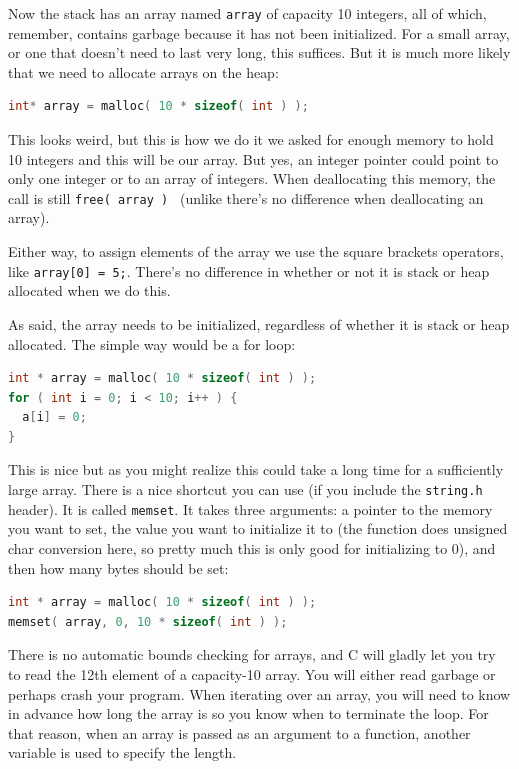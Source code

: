 Now the stack has an array named \texttt{array} of capacity 10 integers, all of which, remember, contains garbage because it has not been initialized. For a small array, or one that doesn't need to last very long, this suffices. But it is much more likely that we need to allocate arrays on the heap:

\begin{lstlisting}[language=C]
int* array = malloc( 10 * sizeof( int ) );
\end{lstlisting}

This looks weird, but this is how we do it we asked for enough memory to hold 10 integers and this will be our array. But yes, an integer pointer could point to only one integer or to an array of integers. When deallocating this memory, the call is still \texttt{free( array ) } (unlike \Cpp there's no difference when deallocating an array).

Either way, to assign elements of the array we use the square brackets operators, like \texttt{array[0] = 5;}. There's no difference in whether or not it is stack or heap allocated when we do this.

As said, the array needs to be initialized, regardless of whether it is stack or heap allocated. The simple way would be a for loop:

\begin{lstlisting}[language=C]
int * array = malloc( 10 * sizeof( int ) );
for ( int i = 0; i < 10; i++ ) {
  a[i] = 0;
}
\end{lstlisting}

This is nice but as you might realize this could take a long time for a sufficiently large array. There is a nice shortcut you can use (if you include the \texttt{string.h} header). It is called \texttt{memset}. It takes three arguments: a pointer to the memory you want to set, the value you want to initialize it to (the function does unsigned char conversion here, so pretty much this is only good for initializing to 0), and then how many bytes should be set:

\begin{lstlisting}[language=C]
int * array = malloc( 10 * sizeof( int ) );
memset( array, 0, 10 * sizeof( int ) );
\end{lstlisting}

There is no automatic bounds checking for arrays, and C will gladly let you try to read the 12th element of a capacity-10 array. You will either read garbage or perhaps crash your program. When iterating over an array, you will need to know in advance how long the array is so you know when to terminate the loop. For that reason, when an array is passed as an argument to a function, another variable is used to specify the length.

